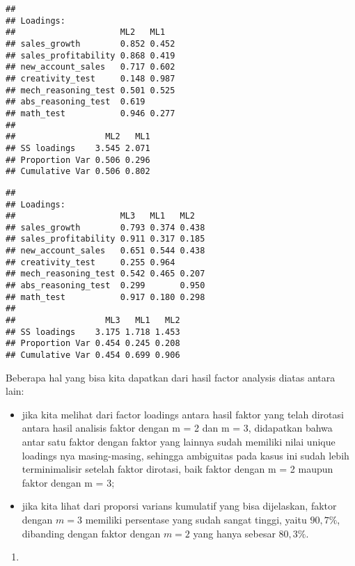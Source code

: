 \documentclass[
]{article}
\newenvironment{Shaded}{\begin{snugshade}}{\end{snugshade}}
\newcommand{\NormalTok}[1]{#1}
\newcommand{\SpecialCharTok}[1]{\textcolor[rgb]{0.00,0.00,0.00}{#1}}
\providecommand{\tightlist}{%
  \setlength{\itemsep}{0pt}\setlength{\parskip}{0pt}}
\begin{document}
\begin{verbatim}
## 
## Loadings:
##                     ML2   ML1  
## sales_growth        0.852 0.452
## sales_profitability 0.868 0.419
## new_account_sales   0.717 0.602
## creativity_test     0.148 0.987
## mech_reasoning_test 0.501 0.525
## abs_reasoning_test  0.619      
## math_test           0.946 0.277
## 
##                  ML2   ML1
## SS loadings    3.545 2.071
## Proportion Var 0.506 0.296
## Cumulative Var 0.506 0.802
\end{verbatim}

\begin{Shaded}
\end{Shaded}

\begin{verbatim}
## 
## Loadings:
##                     ML3   ML1   ML2  
## sales_growth        0.793 0.374 0.438
## sales_profitability 0.911 0.317 0.185
## new_account_sales   0.651 0.544 0.438
## creativity_test     0.255 0.964      
## mech_reasoning_test 0.542 0.465 0.207
## abs_reasoning_test  0.299       0.950
## math_test           0.917 0.180 0.298
## 
##                  ML3   ML1   ML2
## SS loadings    3.175 1.718 1.453
## Proportion Var 0.454 0.245 0.208
## Cumulative Var 0.454 0.699 0.906
\end{verbatim}

Beberapa hal yang bisa kita dapatkan dari hasil factor analysis diatas
antara lain:

\begin{itemize}
\item
  jika kita melihat dari factor loadings antara hasil faktor yang telah
  dirotasi antara hasil analisis faktor dengan m = 2 dan m = 3,
  didapatkan bahwa antar satu faktor dengan faktor yang lainnya sudah
  memiliki nilai unique loadings nya masing-masing, sehingga ambiguitas
  pada kasus ini sudah lebih terminimalisir setelah faktor dirotasi,
  baik faktor dengan m = 2 maupun faktor dengan m = 3;
\item
  jika kita lihat dari proporsi varians kumulatif yang bisa dijelaskan,
  faktor dengan \(m = 3\) memiliki persentase yang sudah sangat tinggi,
  yaitu \(90,7\%\), dibanding dengan faktor dengan \(m = 2\) yang hanya
  sebesar \(80,3\%\).
\end{itemize}

\begin{enumerate}
\def\labelenumi{\alph{enumi}.}
\setcounter{enumi}{2}
\tightlist
\item
\end{enumerate}
\end{document}
